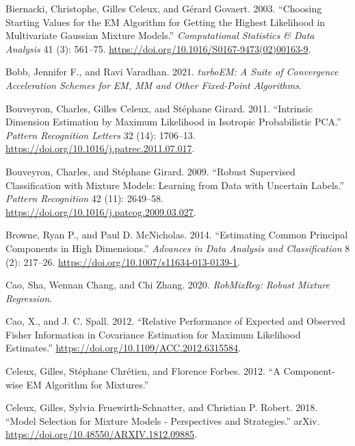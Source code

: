 \begin{CSLReferences}{1}{0}
\leavevmode{}%
Biernacki, Christophe, Gilles Celeux, and Gérard Govaert. 2003. {``Choosing Starting Values for the {EM} Algorithm for Getting the Highest Likelihood in Multivariate {Gaussian} Mixture Models.''} \emph{Computational Statistics \& Data Analysis} 41 (3): 561--75. \url{https://doi.org/10.1016/S0167-9473(02)00163-9}.

\leavevmode{}%
Bobb, Jennifer F., and Ravi Varadhan. 2021. \emph{turboEM: A Suite of Convergence Acceleration Schemes for EM, MM and Other Fixed-Point Algorithms}.

\leavevmode{}%
Bouveyron, Charles, Gilles Celeux, and Stéphane Girard. 2011. {``Intrinsic {Dimension Estimation} by {Maximum Likelihood} in {Isotropic Probabilistic PCA}.''} \emph{Pattern Recognition Letters} 32 (14): 1706--13. \url{https://doi.org/10.1016/j.patrec.2011.07.017}.

\leavevmode{}%
Bouveyron, Charles, and Stéphane Girard. 2009. {``{Robust Supervised Classification} with {Mixture Models}: {Learning} from {Data} with {Uncertain Labels}.''} \emph{Pattern Recognition} 42 (11): 2649--58. \url{https://doi.org/10.1016/j.patcog.2009.03.027}.

\leavevmode{}%
Browne, Ryan P., and Paul D. McNicholas. 2014. {``Estimating Common Principal Components in High Dimensions.''} \emph{Advances in Data Analysis and Classification} 8 (2): 217--26. \url{https://doi.org/10.1007/s11634-013-0139-1}.

\leavevmode{}%
Cao, Sha, Wennan Chang, and Chi Zhang. 2020. \emph{RobMixReg: Robust Mixture Regression}.

\leavevmode{}%
Cao, X., and J. C. Spall. 2012. {``Relative Performance of Expected and Observed Fisher Information in Covariance Estimation for Maximum Likelihood Estimates.''} \url{https://doi.org/10.1109/ACC.2012.6315584}.

\leavevmode{}%
Celeux, Gilles, Stéphane Chrétien, and Florence Forbes. 2012. {``A {Component-wise EM Algorithm} for {Mixtures}.''}

\leavevmode{}%
Celeux, Gilles, Sylvia Fruewirth-Schnatter, and Christian P. Robert. 2018. {``Model Selection for Mixture Models - Perspectives and Strategies.''} arXiv. \url{https://doi.org/10.48550/ARXIV.1812.09885}.


\end{CSLReferences}
